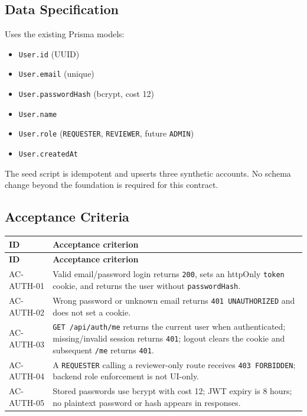 \documentclass[11pt,a4paper]{article}
\begin{document}
\subsection{Data Specification}

Uses the existing Prisma models:\\

\begin{itemize}[leftmargin=*,itemsep=2pt,topsep=2pt]
  \item \texttt{User.id} (UUID)
  \item \texttt{User.email} (unique)
  \item \texttt{User.passwordHash} (bcrypt, cost 12)
  \item \texttt{User.name}
  \item \texttt{User.role} (\texttt{REQUESTER}, \texttt{REVIEWER}, future \texttt{ADMIN})
  \item \texttt{User.createdAt}
\end{itemize}
The seed script is idempotent and upserts three synthetic accounts. No schema\\
change beyond the foundation is required for this contract.\\


\subsection{Acceptance Criteria}

\vspace{0.3em}
\begin{longtable}{|>{\RaggedRight}p{4.5cm}|>{\RaggedRight}p{11.3cm}|}
\hline
\rowcolor{zenPale}\textbf{ID} & \textbf{Acceptance criterion} \\ \hline
\endfirsthead
\hline
\rowcolor{zenPale}\textbf{ID} & \textbf{Acceptance criterion} \\ \hline
\endhead
\hline
\endfoot
AC-AUTH-01 & Valid email/password login returns \texttt{200}, sets an httpOnly \texttt{token} cookie, and returns the user without \texttt{passwordHash}. \\ \hline
AC-AUTH-02 & Wrong password or unknown email returns \texttt{401 UNAUTHORIZED} and does not set a cookie. \\ \hline
AC-AUTH-03 & \texttt{GET /\allowbreak api/\allowbreak auth/\allowbreak me} returns the current user when authenticated; missing/invalid session returns \texttt{401}; logout clears the cookie and subsequent \texttt{/\allowbreak me} returns \texttt{401}. \\ \hline
AC-AUTH-04 & A \texttt{REQUESTER} calling a reviewer-only route receives \texttt{403 FORBIDDEN}; backend role enforcement is not UI-only. \\ \hline
AC-AUTH-05 & Stored passwords use bcrypt with cost 12; JWT expiry is 8 hours; no plaintext password or hash appears in responses. \\ \hline
\end{longtable}
\vspace{0.3em}
\end{document}
